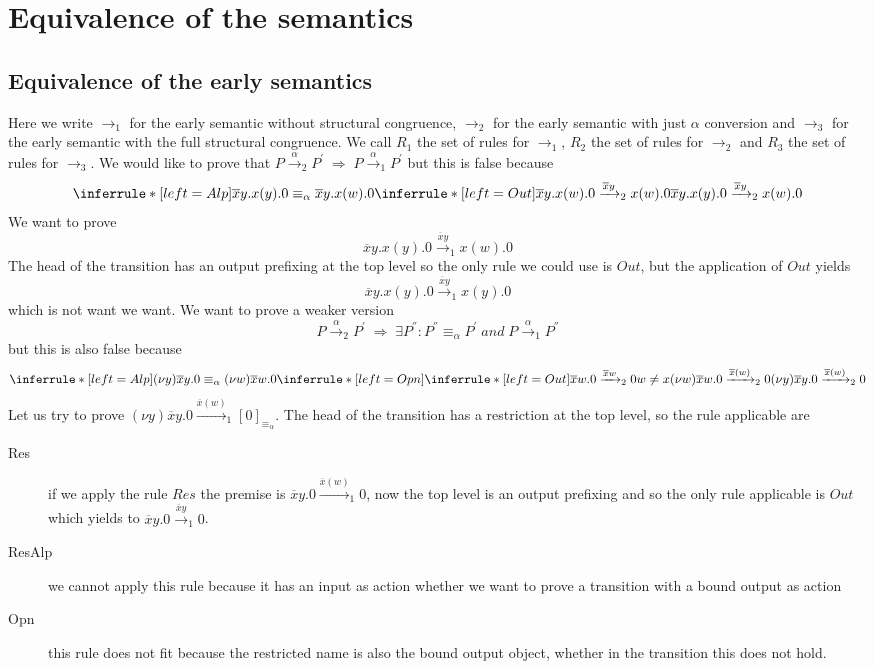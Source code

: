 \section{Equivalence of the semantics}
\subsection{Equivalence of the early semantics}
Here we write $\rightarrow_{1}$ for the early semantic without structural congruence, $\rightarrow_{2}$ for the early semantic with just $\alpha$ conversion and $\rightarrow_{3}$ for the early semantic with the full structural congruence. We call $R_{1}$ the set of rules for $\rightarrow_{1}$, $R_{2}$ the set of rules for $\rightarrow_{2}$ and $R_{3}$ the set of rules for $\rightarrow_{3}$.
We would like to prove that $P\xrightarrow{\alpha}_{2}P^{'}\; \Rightarrow\; P\xrightarrow{\alpha}_{1}P^{'}$ but this is false because
\[
  \inferrule* [left=Alp]{
      \overline{x}y.x(y).0 \equiv_{\alpha} \overline{x}y.x(w).0
    \\
      \inferrule* [left=Out]{
      }{
	\overline{x}y.x(w).0\xrightarrow{\overline{x}y}_{2}x(w).0
      }
  }{
    \overline{x}y.x(y).0\xrightarrow{\overline{x}y}_{2}x(w).0
  }
\]
We want to prove 
\[
  \overline{x}y.x(y).0\xrightarrow{\overline{x}y}_{1}x(w).0
\] 
The head of the transition has an output prefixing at the top level so the only rule we could use is $Out$, but the application of $Out$ yields 
\[
  \overline{x}y.x(y).0\xrightarrow{\overline{x}y}_{1}x(y).0
\] 
which is not want we want. We want to prove a weaker version
\[
  P\xrightarrow{\alpha}_{2}P^{'}\; \Rightarrow\; \exists P^{''}: P^{''}\equiv_{\alpha}P^{'}\; and\; P\xrightarrow{\alpha}_{1}P^{''}
\]
but this is also false because 
\[
  \inferrule* [left=Alp]{
      (\nu y)\overline{x}y.0 \equiv_{\alpha} (\nu w)\overline{x}w.0
    \\
      \inferrule* [left=Opn]{
	  \inferrule* [left=Out]{
	  }{
	    \overline{x}w.0\xrightarrow{\overline{x}w}_{2}0
	  }
	\\
	  w\neq x
      }{
	(\nu w)\overline{x}w.0\xrightarrow{\overline{x}(w)}_{2}0
      }
  }{
    (\nu y)\overline{x}y.0\xrightarrow{\overline{x}(w)}_{2}0
  }
\]
Let us try to prove $(\nu y)\overline{x}y.0\xrightarrow{\overline{x}(w)}_{1}[0]_{\equiv_{\alpha}}$. The head of the transition has a restriction at the top level, so the rule applicable are 
\begin{description}
  \item[Res]
    if we apply the rule $Res$ the premise is $\overline{x}y.0\xrightarrow{\overline{x}(w)}_{1}0$, now the top level is an output prefixing and so the only rule applicable is $Out$ which yields to $\overline{x}y.0\xrightarrow{\overline{x}y}_{1}0$.
  \item[ResAlp]
    we cannot apply this rule because it has an input as action whether we want to prove a transition with a bound output as action
  \item[Opn]
    this rule does not fit because the restricted name is also the bound output object, whether in the transition this does not hold.
\end{description}

